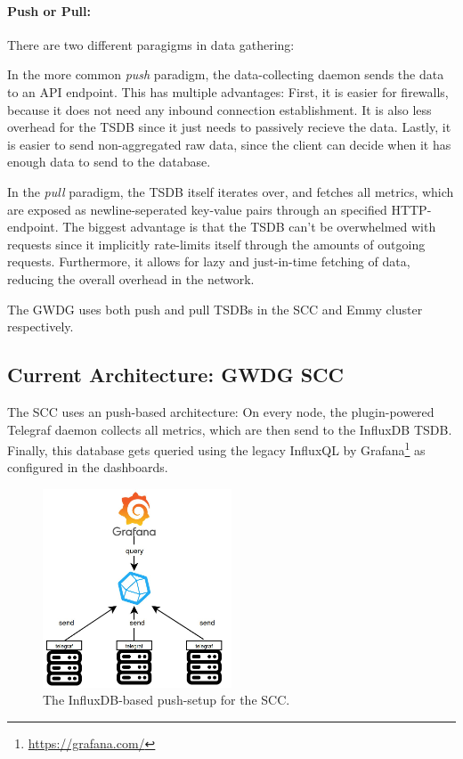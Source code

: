 \paragraph{Push or Pull:} There are two different paragigms in data gathering:

In the more common \emph{push} paradigm, the data-collecting daemon sends the data to an API 
endpoint. This has multiple advantages: First, it is easier for firewalls, because it does not
need any inbound connection establishment. It is also less overhead for the \ac{TSDB} since it
just needs to passively recieve the data. Lastly, it is easier to send non-aggregated raw data,
since the client can decide when it has enough data to send to the database.

In the \emph{pull} paradigm, the \ac{TSDB} itself iterates over, and fetches all metrics, which
are exposed as newline-seperated key-value pairs through an specified HTTP-endpoint. The biggest
advantage is that the \ac{TSDB} can't be overwhelmed with requests since it implicitly rate-limits
itself through the amounts of outgoing requests. Furthermore, it allows for lazy and just-in-time 
fetching of data, reducing the overall overhead in the network.

The \ac{GWDG} uses both push and pull \acp{TSDB} in the \ac{SCC} and Emmy cluster respectively. 

\subsection{Current Architecture: GWDG SCC}

The \ac{SCC} uses an push-based architecture: On every node, the plugin-powered Telegraf 
daemon collects all metrics, which are then send to the InfluxDB \ac{TSDB}. Finally, this database
gets queried using the legacy InfluxQL by Grafana\footnote{\url{https://grafana.com/}} as 
configured in the dashboards.

\begin{figure}[H]
  \centering
  \includegraphics[width=0.5\textwidth]{./assets/influx.jpeg}
  \caption{The InfluxDB-based push-setup for the SCC.}
\end{figure}


